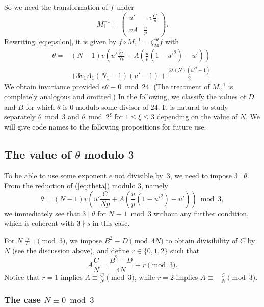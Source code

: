 \documentclass[12pt,twoside,leqno]{article}
\numberwithin{equation}{section}
\renewcommand{\leq}{\leqslant}
\begin{document}
So we need the transformation of $f$ under
$$M_1^{-1} = \begin {pmatrix} u' & -v \frac {C}{p} \\
v A & \frac {u}{p} \end {pmatrix}.$$
Rewriting \eqref {eq:epsilon}, it is given by
$f \circ M_1^{-1} = \zeta_{24}^{e \theta} f$ with
\begin{equation}\label{eq:theta}
\begin {split}
\theta =
& (N-1) v \left(u' \frac{C}{Np} + A \left(\frac{u}{p} (1-{u}'^2)
- u'\right)\right) \\
& + 3 v_1 A_1 (N_1-1) (u'-1) + \frac {3 \lambda (N)
({u'}^2-1)}{2}.
\end {split}
\end{equation}
We obtain invariance provided $e \theta\equiv 0\bmod 24$. (The
treatment of $M_2^{-1}$ is completely analogous and omitted.)
In the following, we classify the
values of $D$ and $B$ for which $\theta$ is $0$
modulo some divisor of $24$.
It is natural to study separately
$\theta\bmod 3$ and $\theta\bmod 2^{\xi}$ for $1\leq \xi \leq 3$
depending on the value of $N$. We will give code names to the
following propositions for future use.

\subsection{The value of \texorpdfstring {$\theta$}{theta} modulo
\texorpdfstring {$3$}{3}}
\label {ssct:theta3}

To be able to use some exponent $e$ not divisible by~$3$, we
need to impose $3 \mid \theta$. From the reduction of (\ref{eq:theta})
modulo $3$, namely
$$\theta = (N-1) v \left(u' \frac{C}{Np} + A \left(\frac{u}{p} (1-{u}'^2)
- u'\right)\right) \bmod 3,$$
we immediately see that $3 \mid \theta$ for $N\equiv 1\bmod 3$
without any further condition, which is coherent with $3 \nmid s$ in this
case.

For $N \not\equiv 1 \pmod 3$, we impose $B^2 \equiv D \pmod {4N}$ to
obtain divisibility of $C$ by $N$ (see the discussion above), and
define $r \in \{ 0, 1, 2 \}$ such that
\begin {equation}
\label {eq:r3}
A \frac {C}{N} = \frac {B^2 - D}{4 N} \equiv r \pmod 3.
\end {equation}
Notice that $r = 1$ implies $A \equiv \frac {C}{N} \pmod 3$,
while $r = 2$ implies $A \equiv - \frac {C}{N} \pmod 3$.


\subsubsection{The case \texorpdfstring {$N\equiv 0\bmod 3$}{N=0 mod 3}}
\end{document}
